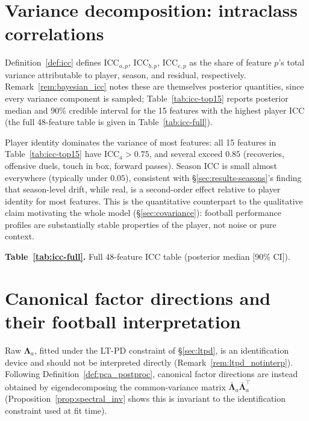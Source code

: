 \section{Variance decomposition: intraclass correlations}
\label{sec:results-icc}

Definition~\ref{def:icc} defines $\mathrm{ICC}_{a,p}$, $\mathrm{ICC}_{b,p}$, $\mathrm{ICC}_{e,p}$ as the share
of feature $p$'s total variance attributable to player, season, and residual, respectively.
Remark~\ref{rem:bayesian_icc} notes these are themselves posterior quantities, since every variance component
is sampled; Table~\ref{tab:icc-top15} reports posterior median and 90\% credible interval for the 15 features
with the highest player ICC (the full 48-feature table is given in Table~\ref{tab:icc-full}).

\begin{table}[h]
\centering
\caption{Player, season, and residual ICC (posterior median [90\% CI]) for the 15 features with the highest
player ICC.}
\label{tab:icc-top15}

\end{table}

Player identity dominates the variance of most features: all 15 features in Table~\ref{tab:icc-top15} have
$\mathrm{ICC}_{a} > 0.75$, and several exceed $0.85$ (recoveries, offensive duels, touch in box, forward
passes). Season ICC is small almost everywhere (typically under $0.05$), consistent with
\S\ref{sec:results-seasons}'s finding that season-level drift, while real, is a second-order effect relative to
player identity for most features. This is the quantitative counterpart to the qualitative claim motivating the
whole model (\S\ref{sec:covariance}): football performance profiles are substantially stable properties of the
player, not noise or pure context.

\begin{center}
\textbf{Table~\ref*{tab:icc-full}.} Full 48-feature ICC table (posterior median [90\% CI]).
\end{center}
\label{tab:icc-full}
\scriptsize

\normalsize

\section{Canonical factor directions and their football interpretation}
\label{sec:results-canonical}

Raw $\boldsymbol\Lambda_a$, fitted under the LT-PD constraint of \S\ref{sec:ltpd}, is an identification device
and should not be interpreted directly (Remark~\ref{rem:ltpd_notinterp}). Following
Definition~\ref{def:pca_postproc}, canonical factor directions are instead obtained by eigendecomposing the
common-variance matrix $\bar{\boldsymbol\Lambda}_a\bar{\boldsymbol\Lambda}_a^\top$
(Proposition~\ref{prop:spectral_inv} shows this is invariant to the identification constraint used at fit
time).

